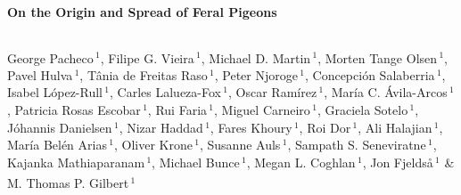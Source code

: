 \documentclass[a4paper]{article}
\begin{document}
\begin{center}
\noindent \LARGE \bfseries {} On the Origin and Spread of Feral Pigeons \\
\end{center}

\hfill\break

\begin{lstlisting}
\end{lstlisting}

 \small \noindent 
George Pacheco\,$^{1}$\textsuperscript{\Letter},
Filipe G. Vieira\,$^{1}$,
Michael D. Martin\,$^{1}$,
Morten Tange Olsen\,$^{1}$,
Pavel Hulva\,$^{1}$,
Tânia de Freitas Raso\,$^{1}$,
Peter Njoroge\,$^{1}$,
Concepción Salaberria\,$^{1}$,
Isabel López-Rull\,$^{1}$,
Carles Lalueza-Fox\,$^{1}$,
Oscar Ramírez\,$^{1}$,
María C. Ávila-Arcos\,$^{1}$,
Patricia Rosas Escobar\,$^{1}$,
Rui Faria\,$^{1}$,
Miguel Carneiro\,$^{1}$,
Graciela Sotelo\,$^{1}$,
Jóhannis Danielsen\,$^{1}$,
Nizar Haddad\,$^{1}$,
Fares Khoury\,$^{1}$,
Roi Dor\,$^{1}$,
Ali Halajian\,$^{1}$,
María Belén Arias\,$^{1}$,
Oliver Krone\,$^{1}$,
Susanne Auls\,$^{1}$,
Sampath S. Seneviratne\,$^{1}$,
Kajanka Mathiaparanam\,$^{1}$,
Michael Bunce\,$^{1}$,
Megan L. Coghlan\,$^{1}$,
Jon Fjeldså\,$^{1}$ \&
M. Thomas P. Gilbert\,$^{1}$\textsuperscript{\Letter}
\end{document}

